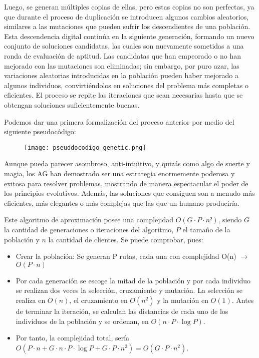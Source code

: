 \documentclass[twocolumn, fontsize=10pt]{article}
\begin{document}
Luego, se generan múltiples copias de ellas, pero estas copias no son perfectas, ya que durante el proceso de duplicación se introducen algunos cambios aleatorios, similares a las mutaciones que pueden sufrir los descendientes de una población. Esta descendencia digital continúa en la siguiente generación, formando un nuevo conjunto de soluciones candidatas, las cuales son nuevamente sometidas a una ronda de evaluación de aptitud. Las candidatas que han empeorado o no han mejorado con las mutaciones son eliminadas; sin embargo, por puro azar, las variaciones aleatorias introducidas en la población pueden haber mejorado a algunos individuos, convirtiéndolos en soluciones del problema más completas o eficientes. El proceso se repite las iteraciones que sean necesarias hasta que se obtengan soluciones suficientemente buenas.

Podemos dar una primera formalización del proceso anterior por medio del siguiente pseudocódigo: 

\begin{figure}[h]
    \centering
    \texttt{[image: pseuddocodigo\_genetic.png]}
    \label{fig:gadget}
\end{figure}

Aunque pueda parecer asombroso, anti-intuitivo, y quizás como algo de suerte y magia, los AG han demostrado ser una estrategia enormemente poderosa y exitosa para resolver problemas, mostrando de manera espectacular el poder de los principios evolutivos. Además, las soluciones que consiguen son a menudo más eficientes, más elegantes o más complejas que las que un humano produciría. 

Este algoritmo de aproximación posee una complejidad \(O(G \cdot P \cdot n²)\), siendo \(G\) la cantidad de generaciones o iteraciones del algoritmo, \(P\) el tamaño de la población y \(n\) la cantidad de clientes. Se puede comprobar, pues:
\begin{itemize}
    \item Crear la población: Se generan P rutas, cada una con complejidad O(n) $\rightarrow$ \(O(P \cdot n)\)
    \item Por cada generación se escoge la mitad de la población y por cada individuo se realizan dos veces la selección, cruzamiento y mutación. La selección se realiza en \(O(n)\), el cruzamiento en \(O(n^2)\) y la mutación en \(O(1)\). Antes de terminar la iteración, se calculan las distancias de cada uno de los individuos de la población y se ordenan, en \(O(n\cdot P \cdot \log P )\). 
    \item Por tanto, la complejidad total, sería \(O(P \cdot n + G \cdot n\cdot P \cdot \log P + G \cdot P \cdot n^2) = O(G \cdot P \cdot n^2)\). 
\end{itemize}
\end{document}

